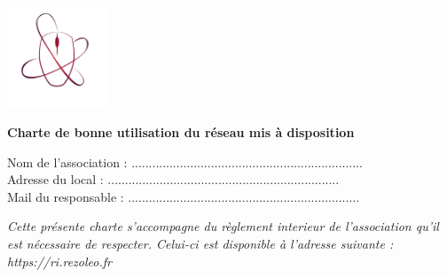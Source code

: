 \documentclass[11pt]{article}
\begin{document}
	
\thispagestyle{empty}

\begin{minipage}{0.15\linewidth}
	\includegraphics[height=3cm]{rezoleo.png}
\end{minipage}\hfill
\begin{minipage}{0.80\linewidth}\center
{\LARGE \textbf{Charte de bonne utilisation du réseau mis à disposition}}

\vspace*{0.5cm}

\begin{flushright}
	Nom de l'association : ...................................................................\\
	Adresse du local : ...................................................................\\
	Mail du responsable : ...................................................................\\
\end{flushright}
\end{minipage}
\vspace*{0.5cm}

\textit{Cette présente charte s'accompagne du règlement interieur de l'association qu'il est nécessaire de respecter. Celui-ci est disponible à l'adresse suivante : https://ri.rezoleo.fr}
\end{document}
